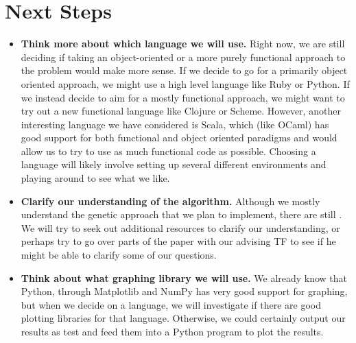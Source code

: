 \documentclass[12pt]{article}
\begin{document}
\section{Next Steps}
\begin{itemize}
	\item \textbf{Think more about which language we will use.} Right now, we are still deciding if taking an object-oriented or a more purely functional approach to the problem would make more sense. If we decide to go for a primarily object oriented approach, we might use a high level language like Ruby or Python. If we instead decide to aim for a mostly functional approach, we might want to try out a new functional language like Clojure or Scheme. However, another interesting language we have considered is Scala, which (like OCaml) has good support for both functional and object oriented paradigms and would allow us to try to use as much functional code as possible. Choosing a language will likely involve setting up several different environments and playing around to see what we like.
	\item \textbf{Clarify our understanding of the algorithm.} Although we mostly understand the genetic approach that we plan to implement, there are still . We will try to seek out additional resources to clarify our understanding, or perhaps try to go over parts of the paper with our advising TF to see if he might be able to clarify some of our questions.
	\item \textbf{Think about what graphing library we will use.} We already know that Python, through Matplotlib and NumPy has very good support for graphing, but when we decide on a language, we will investigate if there are good plotting libraries for that language. Otherwise, we could certainly output our results as test and feed them into a Python program to plot the results.
\end{itemize}
\end{document}
